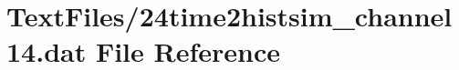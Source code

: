 \hypertarget{24time2histsim__channel14_8dat}{}\section{Text\+Files/24time2histsim\+\_\+channel14.dat File Reference}
\label{24time2histsim__channel14_8dat}
